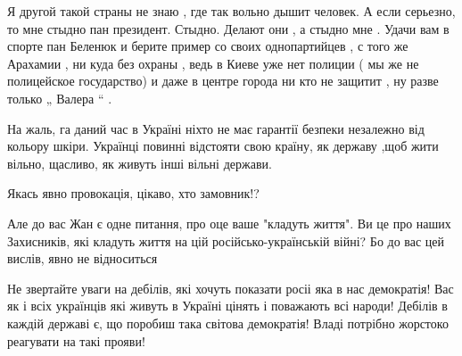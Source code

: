 \begin{itemize}
 

Я другой такой страны не знаю , где так вольно дышит человек. А если серьезно,
то мне стыдно пан президент. Стыдно. Делают они , а стыдно мне . Удачи вам в
спорте пан Беленюк и берите пример со своих однопартийцев , с того же Арахамии
, ни куда без охраны , ведь в Киеве уже нет полиции ( мы же не полицейское
государство) и даже в центре города ни кто не защитит , ну разве только „
Валера “ .

 

На жаль, га даний час в Україні ніхто не має гарантії безпеки незалежно від
кольору шкіри. Українці повинні відстояти свою країну, як державу ,щоб жити
вільно, щасливо, як живуть інші вільні держави.


 

Якась явно провокація, цікаво, хто замовник!?

Але до вас Жан є одне питання, про оце ваше "кладуть життя". Ви це про наших
Захисників, які кладуть життя на цій російсько-українській війні? Бо до вас цей
вислів, явно не відноситься


 

Не звертайте уваги на дебілів, які хочуть показати росіі яка в нас демократія!
Вас як і всіх українців які живуть в Україні цінять і поважають всі народи!
Дебілів в каждій державі є, що поробиш така світова демократія! Владі потрібно
жорстоко реагувати на такі прояви!


 


\end{itemize}
